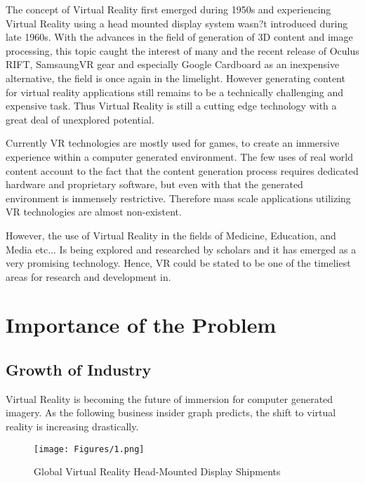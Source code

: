 The concept of Virtual Reality first emerged during 1950s and experiencing Virtual Reality using a head mounted display system wasn?t introduced during late 1960s. With the advances in the field of generation of 3D content and image processing, this topic caught the interest of many and the recent release of Oculus RIFT, SamsaungVR gear and especially Google Cardboard as an inexpensive alternative, the field is once again in the limelight. However generating content for virtual reality applications still remains to be a technically challenging and expensive task. Thus Virtual Reality is still a cutting edge technology with a great deal of unexplored potential.

Currently VR technologies are mostly used for games, to create an immersive experience within a computer generated environment. The few uses of real world content account to the fact that the content generation process requires dedicated hardware and proprietary software, but even with that the generated environment is immensely restrictive. Therefore mass scale applications utilizing VR technologies are almost non-existent.

However, the use of Virtual Reality in the fields of Medicine, Education, and Media etc... Is being explored and researched by scholars and it has emerged as a very promising technology. Hence, VR could be stated to be one of the timeliest areas for research and development in.

\section{Importance of the Problem}
\label{intro_sec:2}

\subsection{Growth of Industry}
\label{intro_subsec:2_1}

Virtual Reality is becoming the future of immersion for computer generated imagery. As the following business insider graph predicts, the shift to virtual reality is increasing drastically.

\begin{figure}[htbp]
\begin{center}
\texttt{[image: Figures/1.png]}
\caption{Global Virtual Reality Head-Mounted Display Shipments \cite{insider2015}}
\label{fig1_1}
\end{center}
\end{figure}


